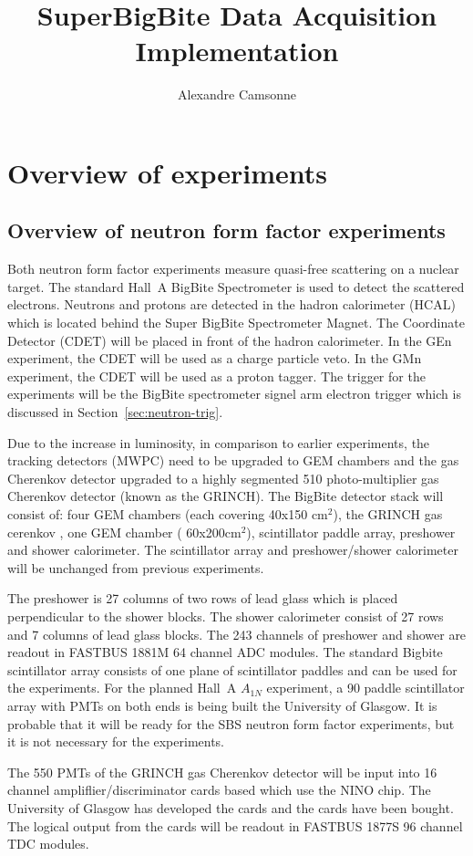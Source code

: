 \documentclass{article}
\title {SuperBigBite Data Acquisition Implementation}
\author{Alexandre Camsonne}
\begin{document}
\section{ Overview of experiments}
\subsection{Overview of neutron form factor experiments}
Both neutron form factor experiments measure quasi-free scattering on a nuclear target. The standard Hall~A
BigBite Spectrometer is used to detect the scattered electrons.  
Neutrons and protons are detected in
the hadron calorimeter (HCAL) which is located behind the Super BigBite Spectrometer Magnet. 
The Coordinate Detector (CDET) will be placed in front of the hadron calorimeter.
In the GEn experiment, the CDET will be used as a charge particle veto. In the GMn experiment,
the CDET will be used as a proton tagger. The trigger for the experiments will be the BigBite spectrometer 
signel arm electron trigger which is discussed in Section~\ref{sec:neutron-trig}.


Due to the increase in
luminosity, in comparison to earlier experiments, the tracking detectors (MWPC) need to be upgraded to
GEM chambers and the gas Cherenkov detector upgraded to a highly segmented 510 photo-multiplier gas
Cherenkov detector (known as the GRINCH).   The BigBite detector stack will consist of:
four GEM chambers (each covering 40x150 cm$^2$), the GRINCH gas cerenkov , one GEM chamber ( 60x200cm$^2$), 
scintillator paddle array, preshower and shower calorimeter. The scintillator array and preshower/shower
calorimeter will be unchanged from previous experiments. 

The preshower is 27 columns of two rows of lead glass which is placed perpendicular to the shower blocks.
The shower calorimeter consist of 27 rows and 7 columns of lead glass blocks. The 243 channels of
preshower and shower are readout in FASTBUS 1881M 64 channel ADC modules. The standard Bigbite 
scintillator array consists of one plane of scintillator paddles and can be used for the experiments. 
For the planned Hall~A $A_{1N}$ experiment, a 90  paddle scintillator array with
PMTs on both ends is being built the University of Glasgow. It is probable that it will
be ready for the SBS neutron form factor experiments, but it is not necessary for the experiments.

The 550 PMTs of the GRINCH gas Cherenkov detector will be input into 16 channel ampliflier/discriminator
cards based which use the NINO chip. The University of Glasgow has developed the cards and the cards have 
been bought. The logical output from the cards will be readout in FASTBUS 1877S 96 channel TDC modules.
\end{document}
